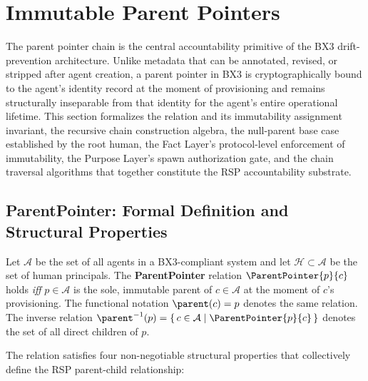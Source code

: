 
\section{Immutable Parent Pointers}
\label{sec:immutable_parent_pointers}

The parent pointer chain is the central accountability primitive of the BX3 drift-prevention architecture. Unlike metadata that can be annotated, revised, or stripped after agent creation, a parent pointer in BX3 is cryptographically bound to the agent's identity record at the moment of provisioning and remains structurally inseparable from that identity for the agent's entire operational lifetime. This section formalizes the  relation and its immutability assignment invariant, the recursive chain construction algebra, the null-parent base case established by the root human, the Fact Layer's protocol-level enforcement of immutability, the Purpose Layer's spawn authorization gate, and the chain traversal algorithms that together constitute the RSP accountability substrate.

\subsection{ParentPointer: Formal Definition and Structural Properties}
\label{sec:pp_formal_definition}

\begin{definition}[ParentPointer]
\label{def:parent_pointer}
Let $\mathcal{A}$ be the set of all agents in a BX3-compliant system and let $\mathcal{H} \subset \mathcal{A}$ be the set of human principals. The \textbf{ParentPointer} relation $\ParentPointer{p}{c}$ holds \emph{iff} $p \in \mathcal{A}$ is the sole, immutable parent of $c \in \mathcal{A}$ at the moment of $c$'s provisioning. The functional notation $\parent(c) = p$ denotes the same relation. The inverse relation $\parent^{-1}(p) = \{\, c \in \mathcal{A} \mid \ParentPointer{p}{c} \,\}$ denotes the set of all direct children of $p$.
\end{definition}

The  relation satisfies four non-negotiable structural properties that collectively define the RSP parent-child relationship:

